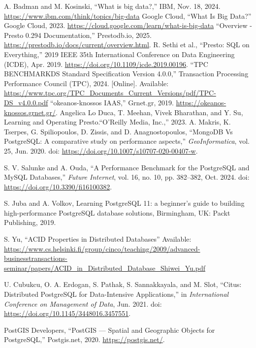 \documentclass[conference]{IEEEtran}
\begin{document}
\begin{thebibliography}{00}
     A. Badman and M. Kosinski, ``What is big data?,'' IBM, Nov. 18, 2024. \url{https://www.ibm.com/think/topics/big-data}
     Google Cloud, ``What Is Big Data?'' Google Cloud, 2023. \url{https://cloud.google.com/learn/what-is-big-data}
     ``Overview - Presto 0.294 Documentation,'' Prestodb.io, 2025. \href{https://prestodb.io/docs/current/overview.html}{https://prestodb.io/docs/current/overview.html}.
     R. Sethi et al., ``Presto: SQL on Everything,''
    2019 IEEE 35th International Conference on Data Engineering (ICDE), Apr. 2019.
    \url{https://doi.org/10.1109/icde.2019.00196}.
     ``TPC BENCHMARK\texttrademark DS Standard Specification Version 4.0.0,''
    Transaction Processing Performance Council (TPC), 2024. [Online]. Available: \url{https://www.tpc.org/TPC_Documents_Current_Versions/pdf/TPC-DS_v4.0.0.pdf}
     ``okeanos-knossos IAAS,'' Grnet.gr, 2019.
    \url{https://okeanos-knossos.grnet.gr/}.
     Angelica Lo Duca, T. Meehan, Vivek Bharathan, and Y. Su, Learning and Operating Presto.``O’Reilly Media, Inc.,'' 2023.
     A. Makris, K. Tserpes, G. Spiliopoulos, D. Zissis, and D. Anagnostopoulos, ``MongoDB Vs PostgreSQL: A comparative study on performance aspects,'' \textit{GeoInformatica}, vol. 25, Jun. 2020. doi: \url{https://doi.org/10.1007/s10707-020-00407-w}.

     S. V. Salunke and A. Ouda, ``A Performance Benchmark for the PostgreSQL and MySQL Databases,'' \textit{Future Internet}, vol. 16, no. 10, pp. 382--382, Oct. 2024. doi: \url{https://doi.org/10.3390/fi16100382}.

     S. Juba and A. Volkov, Learning PostgreSQL 11: a beginner’s guide to building high-performance PostgreSQL database solutions, Birmingham, UK: Packt Publishing, 2019.

     S. Yu, ``ACID Properties in Distributed Databases'' Available: \url{https://www.cs.helsinki.fi/group/cinco/teaching/2009/advanced-businesstransactions-seminar/papers/ACID_in_Distributed_Database_Shiwei_Yu.pdf}

     U. Cubukcu, O. A. Erdogan, S. Pathak, S. Sannakkayala, and M. Slot, ``Citus: Distributed PostgreSQL for Data-Intensive Applications,'' in \textit{International Conference on Management of Data}, Jun. 2021. doi: \url{https://doi.org/10.1145/3448016.3457551}.

     PostGIS Developers, ``PostGIS — Spatial and Geographic Objects for PostgreSQL,'' Postgis.net, 2020. \url{https://postgis.net/}.


\end{thebibliography}
\end{document}

